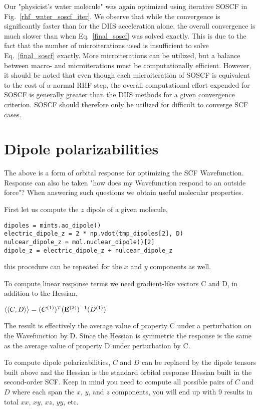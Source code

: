 \documentclass[aip,jcp,preprint,superscriptaddress,floatfix]{revtex4-1}
\begin{document}
Our "physicist's water molecule" was again optimized using iterative SOSCF in Fig.~\ref{rhf_water_soscf_iter}.
We observe that while the convergence is significantly faster than for the DIIS acceleration alone, the overall convergence is much slower than when Eq.~\ref{final_soscf} was solved exactly.
This is due to the fact that the number of microiterations used is insufficient to solve Eq.~\ref{final_soscf} exactly.
More microiterations can be utilized, but a balance between macro- and microiterations must be computationally efficient.
However, it should be noted that even though each microiteration of SOSCF is equivalent to the cost of a normal RHF step, the overall computational effort expended for SOSCF is generally greater than the DIIS methods for a given convergence criterion.
SOSCF should therefore only be utilized for difficult to converge SCF cases.

\section{Dipole polarizabilities}

The above is a form of orbital response for optimizing the SCF Wavefunction.
Response can also be taken "how does my Wavefunction respond to an outside force"?
When answering such questions we obtain useful molecular properties.

First let us compute the $z$ dipole of a given molecule,

\begin{verbatim}
dipoles = mints.ao_dipole()
electric_dipole_z = 2 * np.vdot(tmp_dipoles[2], D)
nulcear_dipole_z = mol.nuclear_dipole()[2]
dipole_z = electric_dipole_z + nulcear_dipole_z
\end{verbatim}

this procedure can be repeated for the $x$ and $y$ components as well.

To compute linear response terms we need gradient-like vectors C and D, in addition to the Hessian,

$\langle \langle C, D \rangle \rangle =  (C^{(1)})^T ({\rm\bf E}^{(2)})^{-1}  (D^{(1)})  $

The result is effectively the average value of property C under a perturbation on the Wavefunction by D.
Since the Hessian is symmetric the response is the same as the average value of property D under perturbation by C.

To compute dipole polarizabilities, $C$ and $D$ can be replaced by the dipole tensors built above and the Hessian is the standard orbital response Hessian built in the second-order SCF.
Keep in mind you need to compute all possible pairs of $C$ and $D$ where each span the $x$, $y$, and $z$ components, you will end up with 9 results in total $xx$, $xy$, $xz$, $yy$, etc.




\end{document}
